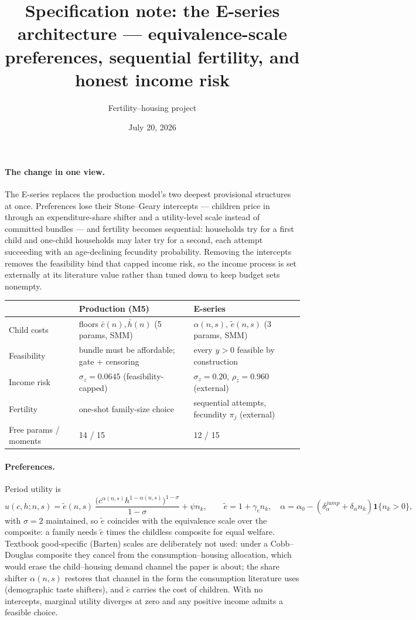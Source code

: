 \documentclass[10pt]{article}
\title{\vspace{-1.3em}\large\textbf{Specification note: the E-series architecture --- equivalence-scale preferences, sequential fertility, and honest income risk}\vspace{-0.4em}}
\author{\normalsize Fertility--housing project}
\date{\normalsize July 20, 2026}
\begin{document}
\maketitle
\vspace{-1.5em}

\paragraph{The change in one view.}
The E-series replaces the production model's two deepest provisional
structures at once. Preferences lose their Stone--Geary intercepts ---
children price in through an expenditure-share shifter and a
utility-level scale instead of committed bundles --- and fertility becomes
sequential: households try for a first child and one-child households may
later try for a second, each attempt succeeding with an age-declining
fecundity probability. Removing the intercepts removes the feasibility
bind that capped income risk, so the income process is set externally at
its literature value rather than tuned down to keep budget sets nonempty.

\begin{center}\footnotesize
\begin{tabular}{lll}
\toprule
 & Production (M5) & E-series \\
\midrule
Child costs & floors $\bar c(n), \bar h(n)$ (5 params, SMM) & $\alpha(n,s)$, $\tilde e(n,s)$ (3 params, SMM) \\
Feasibility & bundle must be affordable; gate + censoring & every $y>0$ feasible by construction \\
Income risk & $\sigma_z=0.0645$ (feasibility-capped) & $\sigma_z=0.20$, $\rho_z=0.960$ (external) \\
Fertility & one-shot family-size choice & sequential attempts, fecundity $\pi_j$ (external) \\
Free params / moments & 14 / 15 & 12 / 15 \\
\bottomrule
\end{tabular}
\end{center}

\paragraph{Preferences.}
Period utility is
\[
u(c,h;n,s)=\tilde e(n,s)\,
\frac{\bigl(c^{\alpha(n,s)}h^{1-\alpha(n,s)}\bigr)^{1-\sigma}}{1-\sigma}
+\psi n_k,\qquad
\tilde e = 1+\gamma_e n_k,\quad
\alpha = \alpha_0-(\delta^{jump}_\alpha+\delta_\alpha n_k)\mathbf{1}\{n_k>0\},
\]
with $\sigma=2$ maintained, so $\tilde e$ coincides with the equivalence
scale over the composite: a family needs $\tilde e$ times the childless
composite for equal welfare. Textbook good-specific (Barten) scales are
deliberately not used: under a Cobb--Douglas composite they cancel from
the consumption--housing allocation, which would erase the child--housing
demand channel the paper is about; the share shifter $\alpha(n,s)$
restores that channel in the form the consumption literature uses
(demographic taste shifters), and $\tilde e$ carries the cost of children.
With no intercepts, marginal utility diverges at zero and any positive
income admits a feasible choice.
\end{document}
